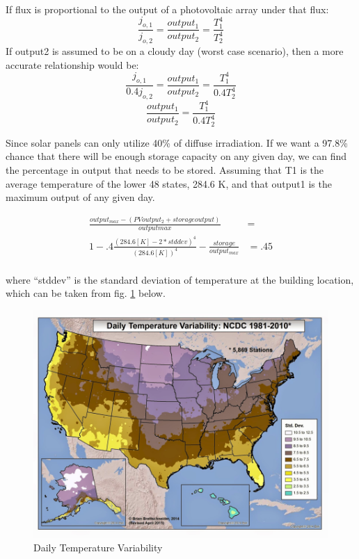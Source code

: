 If flux is proportional to the output of a photovoltaic array under that flux:
\begin{equation}
\frac{j_{o,1}}{j_{o,2}}=\frac{output_1}{output_2}=\frac{T_1^4}{T_2^4}
\end{equation}
If output2 is assumed to be on a cloudy day (worst case scenario), then a more
accurate relationship would be:
\begin{equation}
\frac{j_{o,1}}{0.4j_{o,2}}=\frac{output_1}{output_2}=\frac{T_1^4}{0.4T_2^4}
\end{equation}
\begin{equation}
\frac{output_1}{output_2}=\frac{T_1^4}{0.4T_2^4}
\end{equation}

Since solar panels can only utilize 40\% of diffuse irradiation. If we want a
97.8\% chance that there will be enough storage capacity on any given day, we
can find the percentage in output that needs to be stored. Assuming that T1 is
the average temperature of the lower 48 states, 284.6 K, and that output1 is
the maximum output of any given day.

\begin{equation}
\begin{aligned}
\frac{output_{max}-(PV output_2+storage output)}{outputmax} &= \\
1-.4\frac{(284.6[K]-2*stddev)^4}{(284.6[K])^4}-\frac{storage}{output_{max}}
&=.45
\\
\end{aligned}
\end{equation}
 
where ``stddev'' is the standard deviation of
temperature at the building location, which can be taken from fig. \ref{p3}
below.

\begin{figure}
\begin{center}
\includegraphics[scale=0.6]{pics/PatrickFigure3.png}
\caption{Daily Temperature Variability}
\label{p3}
\end{center}
\end{figure}

